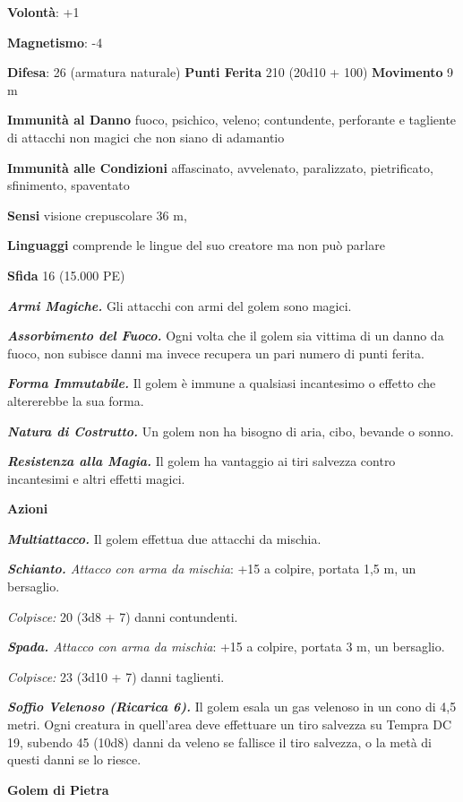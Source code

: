 \begin{multicols}{2}
\textbf{Volontà}: +1

\textbf{Magnetismo}: -4

\textbf{Difesa}: 26 (armatura naturale) \textbf{Punti Ferita}
210 (20d10 + 100) \textbf{Movimento} 9 m

\textbf{Immunità al Danno} fuoco, psichico, veleno; contundente,
perforante e tagliente di attacchi non magici che non siano di adamantio

\textbf{Immunità alle Condizioni} affascinato, avvelenato, paralizzato,
pietrificato, sfinimento, spaventato

\textbf{Sensi} visione crepuscolare 36 m, 

\textbf{Linguaggi} comprende le lingue del suo creatore ma non può
parlare

\textbf{Sfida} 16 (15.000 PE)

\emph{\textbf{Armi Magiche.}} Gli attacchi con armi del golem sono
magici.

\emph{\textbf{Assorbimento del Fuoco.}} Ogni volta che il golem sia
vittima di un danno da fuoco, non subisce danni ma invece recupera un
pari numero di punti ferita.

\emph{\textbf{Forma Immutabile.}} Il golem è immune a qualsiasi
incantesimo o effetto che altererebbe la sua forma.

\emph{\textbf{Natura di Costrutto.}} Un golem non ha bisogno di aria,
cibo, bevande o sonno.

\emph{\textbf{Resistenza alla Magia.}} Il golem ha vantaggio ai tiri
salvezza contro incantesimi e altri effetti magici.

\textbf{Azioni}

\emph{\textbf{Multiattacco.}} Il golem effettua due attacchi da mischia.

\emph{\textbf{Schianto.} Attacco con arma da mischia}: +15 a colpire,
portata 1,5 m, un bersaglio.

\emph{Colpisce:} 20 (3d8 + 7) danni contundenti.

\emph{\textbf{Spada.} Attacco con arma da mischia}: +15 a colpire,
portata 3 m, un bersaglio.

\emph{Colpisce:} 23 (3d10 + 7) danni taglienti.

\emph{\textbf{Soffio Velenoso (Ricarica 6).}} Il golem esala un gas
velenoso in un cono di 4,5 metri. Ogni creatura in quell'area deve
effettuare un tiro salvezza su Tempra DC 19, subendo 45 (10d8)
danni da veleno se fallisce il tiro salvezza, o la metà di questi danni
se lo riesce.

\textbf{Golem di Pietra}


\end{multicols}
